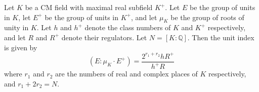 Let $K$ be a CM field with maximal real subfield $K^+$. Let $E$ be the group of units in $K$, let $E^+$ be the group of units in $K^+$, and let $\mu_K$ be the group of roots of unity in $K$. Let $h$ and $h^+$ denote the class numbers of $K$ and $K^+$ respectively, and let $R$ and $R^+$ denote their regulators. Let $N = [K : \mathbb{Q}]$. Then the unit index is given by
$$(E : \mu_K \cdot E^+) = \frac{2^{r_1 + r_2} h R^+}{h^+ R}$$
where $r_1$ and $r_2$ are the numbers of real and complex places of $K$ respectively, and $r_1 + 2r_2 = N$.
